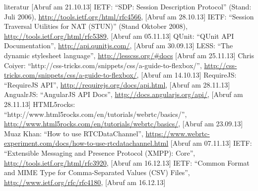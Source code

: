 \begin{thebibliography}{literatur}
		[Abruf am 21.10.13]
	 IETF:
		"`SDP: Session Description Protocol"' (Stand: Juli 2006),
		\hyperlink{http://tools.ietf.org/html/rfc4566}{http://tools.ietf.org/html/rfc4566},
		[Abruf am 28.10.13]
	 IETF:
		"`Session Traversal Utilities for NAT (STUN)"' (Stand Oktober 2008),
		\hyperlink{http://tools.ietf.org/html/rfc5389}{http://tools.ietf.org/html/rfc5389},
		[Abruf am 05.11.13]
	 QUnit: %
		"`QUnit API Documentation"',
		\hyperlink{http://api.qunitjs.com/}{http://api.qunitjs.com/},
		[Abruf am 30.09.13]
	 LESS:
		"`The dynamic stylesheet language"',
		\hyperlink{http://lesscss.org/\#docs}{http://lesscss.org/\#docs}
		[Abruf am 25.11.13]
	 Chris Coiyer:
		"`http://css-tricks.com/snippets/css/a-guide-to-flexbox/"',
		\hyperlink{http://css-tricks.com/snippets/css/a-guide-to-flexbox/}{http://css-tricks.com/snippets/css/a-guide-to-flexbox/},
		[Abruf am 14.10.13]
	 RequireJS:
		"`RequireJS API"',
		\hyperlink{http://requirejs.org/docs/api.html}{http://requirejs.org/docs/api.html},
		[Abruf am 28.11.13]
	 AngualrJS:
		"`AngularJS API Docs"',
		\hyperlink{http://docs.angularjs.org/api/}{http://docs.angularjs.org/api/},
		[Abruf am 28.11.13]
	 HTML5rocks:
		"`http://www.html5rocks.com/en/tutorials/webrtc/basics/"',
		\hyperlink{http://www.html5rocks.com/en/tutorials/webrtc/basics/}{http://www.html5rocks.com/en/tutorials/webrtc/basics/},
		[Abruf am 23.09.13]
	 Muaz Khan:
		"`How to use RTCDataChannel"',
		\hyperlink{https://www.webrtc-experiment.com/docs/how-to-use-rtcdatachannel.html}{https://www.webrtc-experiment.com/docs/how-to-use-rtcdatachannel.html}
		[Abruf am 07.11.13]
	 IETF:
		"`Extensible Messaging and Presence Protocol (XMPP): Core"',
		\hyperlink{http://tools.ietf.org/html/rfc3920}{http://tools.ietf.org/html/rfc3920},
		[Abruf am 16.12.13]
	 IETF:
		"`Common Format and MIME Type for Comma-Separated Values (CSV) Files"',
		\hyperlink{http://www.ietf.org/rfc/rfc4180}{http://www.ietf.org/rfc/rfc4180},
		[Abruf am 16.12.13]
\end{thebibliography}


\appendix
















%



